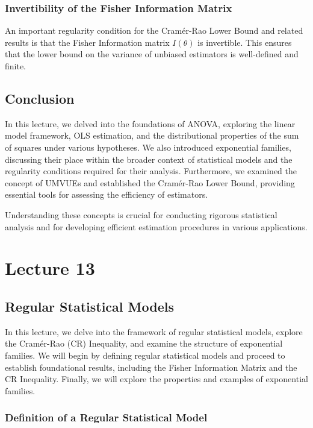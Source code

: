 \documentclass[open=any, 11pt,paper=A4]{scrreprt}
\begin{document}
\subsection{Invertibility of the Fisher Information Matrix}

An important regularity condition for the Cramér-Rao Lower Bound and related results is that the Fisher Information matrix $I(\theta)$ is invertible. This ensures that the lower bound on the variance of unbiased estimators is well-defined and finite.

\section{Conclusion}

In this lecture, we delved into the foundations of ANOVA, exploring the linear model framework, OLS estimation, and the distributional properties of the sum of squares under various hypotheses. We also introduced exponential families, discussing their place within the broader context of statistical models and the regularity conditions required for their analysis. Furthermore, we examined the concept of UMVUEs and established the Cramér-Rao Lower Bound, providing essential tools for assessing the efficiency of estimators.

Understanding these concepts is crucial for conducting rigorous statistical analysis and for developing efficient estimation procedures in various applications.
\chapter{Lecture 13}


\section*{Regular Statistical Models}

In this lecture, we delve into the framework of regular statistical models, explore the Cramér-Rao (CR) Inequality, and examine the structure of exponential families. We will begin by defining regular statistical models and proceed to establish foundational results, including the Fisher Information Matrix and the CR Inequality. Finally, we will explore the properties and examples of exponential families.

\subsection*{Definition of a Regular Statistical Model}
\end{document}
